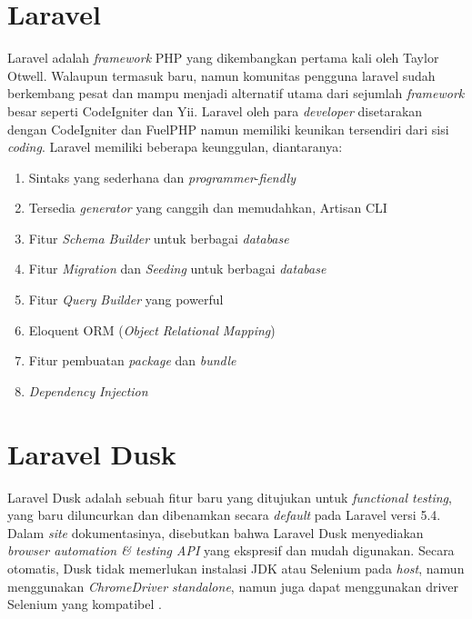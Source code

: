 	 \section{  Laravel}
	 Laravel adalah \textit{framework} PHP yang dikembangkan pertama kali oleh Taylor Otwell. Walaupun termasuk baru, namun komunitas pengguna laravel sudah berkembang pesat dan mampu menjadi alternatif utama dari sejumlah \textit{framework} besar seperti CodeIgniter dan Yii. Laravel oleh para \textit{developer} disetarakan dengan CodeIgniter dan FuelPHP namun memiliki keunikan tersendiri dari sisi \textit{coding}. Laravel memiliki beberapa keunggulan, diantaranya:
	 \begin{enumerate}
	    	\item Sintaks yang sederhana dan \textit{programmer}-\textit{fiendly}
	    	\item Tersedia \textit{generator} yang canggih dan memudahkan, Artisan CLI
	    	\item Fitur \textit{Schema} \textit{Builder} untuk berbagai \textit{database}
	    	\item Fitur \textit{Migration} dan \textit{Seeding} untuk berbagai \textit{database}
	    	\item Fitur \textit{Query} \textit{Builder} yang powerful
	    	\item Eloquent ORM (\textit{Object} \textit{Relational} \textit{Mapping})
	    	\item Fitur pembuatan \textit{package} dan \textit{bundle}
	    	\item \textit{Dependency} \textit{Injection} \cite{noauthor_apa_2016}
	 \end{enumerate}
	 
	 
	\section{  Laravel Dusk}
	Laravel Dusk adalah sebuah fitur baru yang ditujukan untuk \textit{functional testing}, yang baru diluncurkan dan dibenamkan secara \textit{default} pada Laravel versi 5.4. Dalam \textit{site} dokumentasinya, disebutkan bahwa Laravel Dusk menyediakan \textit{browser automation \& testing API} yang ekspresif dan mudah digunakan. Secara otomatis, Dusk tidak memerlukan instalasi JDK atau Selenium pada \textit{host}, namun menggunakan \textit{ChromeDriver standalone}, namun juga dapat menggunakan driver Selenium yang kompatibel \cite{laravel_browser_nodate}.
	     
	     
	  

